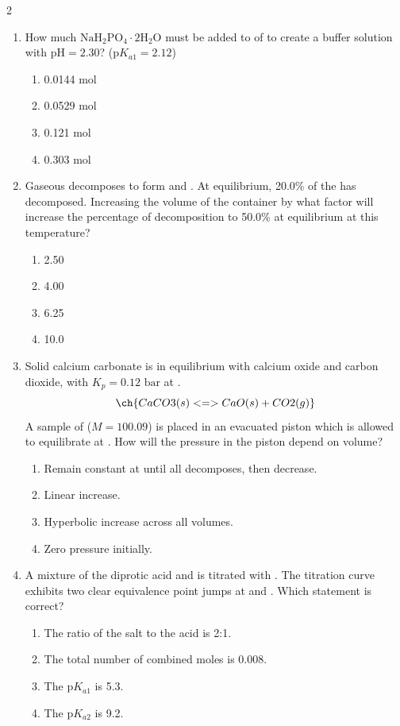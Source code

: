 \documentclass[10pt,letterpaper]{article}
\begin{document}
\begin{multicols*}{2}
\begin{enumerate}
    \item How much $\text{NaH}_2\text{PO}_4 \cdot 2\text{H}_2\text{O}$ must be added to  of   to create a buffer solution with $\text{pH} = 2.30$? ($\text{p}K_{a1} = 2.12$)
    \begin{enumerate}[label=(\textsubscript{\Alph*})]
        \item 0.0144 mol
        \item 0.0529 mol
        \item 0.121 mol
        \item 0.303 mol
    \end{enumerate}

    \item Gaseous  decomposes to form  and . At equilibrium, 20.0\% of the  has decomposed. Increasing the volume of the container by what factor will increase the percentage of decomposition to 50.0\% at equilibrium at this temperature?
    \begin{enumerate}[label=(\textsubscript{\Alph*})]
        \item 2.50
        \item 4.00
        \item 6.25
        \item 10.0
    \end{enumerate}

    \item Solid calcium carbonate is in equilibrium with calcium oxide and carbon dioxide, with $K_p = 0.12\text{ bar}$ at .
    \[ \ch{CaCO3(s) <=> CaO(s) + CO2(g)} \]
    A  sample of  ($M = 100.09$) is placed in an evacuated piston which is allowed to equilibrate at . How will the pressure in the piston depend on volume?
    \begin{enumerate}[label=(\textsubscript{\Alph*})]
        \item Remain constant at  until all  decomposes, then decrease.
        \item Linear increase.
        \item Hyperbolic increase across all volumes.
        \item Zero pressure initially.
    \end{enumerate}

    \item A mixture of the diprotic acid  and  is titrated with  . The titration curve exhibits two clear equivalence point jumps at  and . Which statement is correct?
    \begin{enumerate}[label=(\textsubscript{\Alph*})]
        \item The ratio of the salt to the acid is 2:1.
        \item The total number of combined moles is 0.008.
        \item The $\text{p}K_{a1}$ is 5.3.
        \item The $\text{p}K_{a2}$ is 9.2.
    \end{enumerate}


\end{enumerate}
\end{multicols*}
\end{document}
